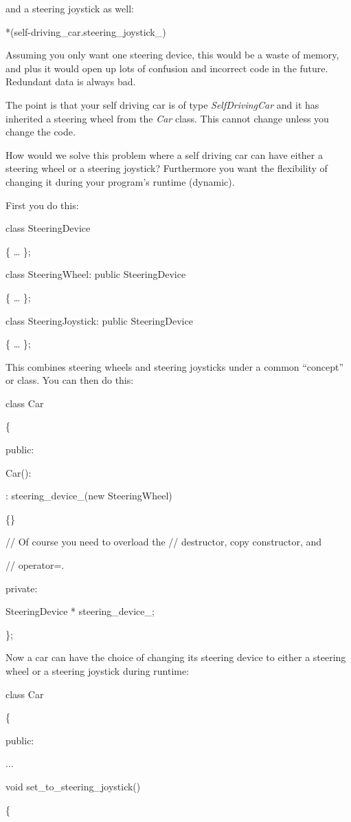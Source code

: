 \documentclass[
]{article}
\begin{document}
and a steering joystick as well:

*(self-driving\_car.steering\_joystick\_)

Assuming you only want one steering device, this would be a waste of
memory, and plus it would open up lots of confusion and incorrect code
in the future. Redundant data is always bad.

The point is that your self driving car is of type \emph{SelfDrivingCar}
and it has inherited a steering wheel from the \emph{Car} class. This
cannot change unless you change the code.

How would we solve this problem where a self driving car can have either
a steering wheel or a steering joystick? Furthermore you want the
flexibility of changing it during your program's runtime (dynamic).

First you do this:

class SteeringDevice

\{ \ldots{} \};

class SteeringWheel: public SteeringDevice

\{ \ldots{} \};

class SteeringJoystick: public SteeringDevice

\{ \ldots{} \};

This combines steering wheels and steering joysticks under a common
``concept'' or class. You can then do this:

class Car

\{

public:

Car():

: steering\_device\_(new SteeringWheel)

\{\}

// Of course you need to overload the // destructor, copy constructor,
and

// operator=.

private:

SteeringDevice * steering\_device\_;

\};

Now a car can have the choice of changing its steering device to either
a steering wheel or a steering joystick during runtime:

class Car

\{

public:

...

void set\_to\_steering\_joystick()

\{
\end{document}
